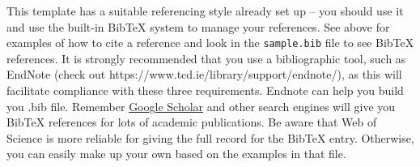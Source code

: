 This template has a suitable referencing style already set up -- you should use it and use the built-in BibTeX system to manage your references. See above for examples of how to cite a reference and look in the \texttt{sample.bib} file to see BibTeX references. It is strongly recommended that you use a bibliographic tool, such as EndNote (check out https://www.tcd.ie/library/support/endnote/), as this will facilitate compliance with these three requirements. Endnote can help you build you .bib file. Remember \href{http://scholar.google.com}{Google Scholar} and other search engines will give you BibTeX references for lots of academic publications. Be aware that Web of Science is more reliable for giving the full record for the BibTeX entry. Otherwise, you can easily make up your own based on the examples in that file.